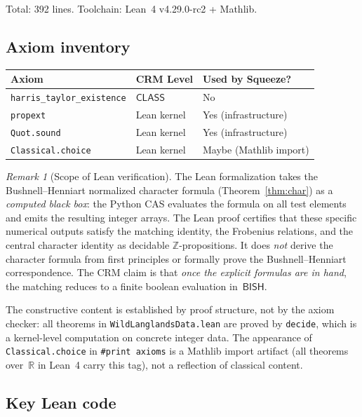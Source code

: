 \documentclass[11pt]{article}
\theoremstyle{plain}
\theoremstyle{definition}
\theoremstyle{remark}
\newtheorem{remark}[theorem]{Remark}
\newcommand{\Z}{\mathbb{Z}}
\newcommand{\R}{\mathbb{R}}
\newcommand{\BISH}{\mathsf{BISH}}
\newcommand{\CLASS}{\mathsf{CLASS}}
\begin{document}
Total: 392 lines.  Toolchain: Lean~4 v4.29.0-rc2 + Mathlib.

\subsection{Axiom inventory}

\begin{center}
\begin{tabular}{lll}
\toprule
\textbf{Axiom} & \textbf{CRM Level} & \textbf{Used by Squeeze?} \\
\midrule
\texttt{harris\_taylor\_existence} & $\CLASS$ & No \\
\texttt{propext} & Lean kernel & Yes (infrastructure) \\
\texttt{Quot.sound} & Lean kernel & Yes (infrastructure) \\
\texttt{Classical.choice} & Lean kernel & Maybe (Mathlib import) \\
\bottomrule
\end{tabular}
\end{center}

\begin{remark}[Scope of Lean verification]\label{rmk:scope}
The Lean formalization takes the Bushnell--Henniart normalized
character formula (Theorem~\ref{thm:char}) as a
\emph{computed black box}: the Python CAS evaluates the
formula on all test elements and emits the resulting integer
arrays.  The Lean proof certifies that these specific
numerical outputs satisfy the matching identity, the
Frobenius relations, and the central character identity as
decidable $\Z$-propositions.  It does \emph{not} derive the
character formula from first principles or formally prove
the Bushnell--Henniart correspondence.  The CRM claim is
that \emph{once the explicit formulas are in hand}, the
matching reduces to a finite boolean evaluation in~$\BISH$.
\end{remark}

The constructive content is established by proof structure,
not by the axiom checker: all theorems in
\texttt{WildLanglandsData.lean} are proved by \texttt{decide},
which is a kernel-level computation on concrete integer data.
The appearance of \texttt{Classical.choice} in
\texttt{\#print axioms} is a Mathlib import artifact (all
theorems over~$\R$ in Lean~4 carry this tag), not a
reflection of classical content.

\subsection{Key Lean code}
\end{document}
